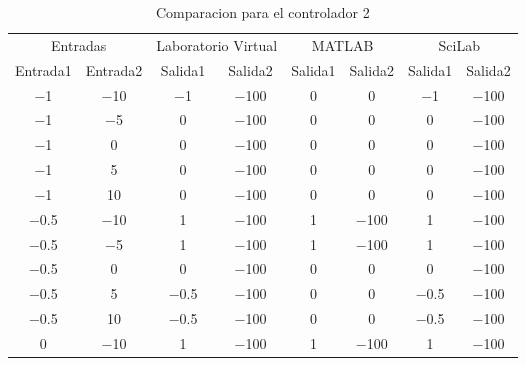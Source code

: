         {\setlength\LTleft{0pt}
        \setlength\LTright{0pt}
        \centering
        \scriptsize
        \renewcommand{\arraystretch}{0.89}
        \begin{longtable}{c @{\extracolsep{\fill}} ccccccc}
        \caption[Comparacion de diseño de controladores difusos - controlador 2]{Comparacion para el controlador 2} 
        \label{tab:C2Difuso} \\
        \toprule
        \multicolumn{2}{c}{Entradas}& \multicolumn{2}{c}{Laboratorio Virtual} & \multicolumn{2}{c}{MATLAB} & \multicolumn{2}{c}{SciLab} \\ \cmidrule{1-2}\cmidrule{3-4}\cmidrule{5-6}\cmidrule{7-8}
        Entrada1   & Entrada2  & Salida1    & Salida2    & Salida1   & Salida2    & Salida1    & Salida2     \\ \cmidrule{1-1}\cmidrule{2-2} \cmidrule{3-3}\cmidrule{4-4}\cmidrule{5-5}\cmidrule{6-6}\cmidrule{7-7}\cmidrule{8-8} 
        \endhead
        \bottomrule
        \endfoot
        \num{-1}   & \num{-10} & \num{-1}   & \num{-100} & \num{0}   & \num{0}    & \num{-1}   & \num{-100}  \\
        \num{-1}   & \num{-5}  & \num{0}    & \num{-100} & \num{0}   & \num{0}    & \num{0}    & \num{-100}  \\
        \num{-1}   & \num{0}   & \num{0}    & \num{-100} & \num{0}   & \num{0}    & \num{0}    & \num{-100}  \\
        \num{-1}   & \num{5}   & \num{0}    & \num{-100} & \num{0}   & \num{0}    & \num{0}    & \num{-100}  \\
        \num{-1}   & \num{10}  & \num{0}    & \num{-100} & \num{0}   & \num{0}    & \num{0}    & \num{-100}  \\
        \num{-0.5} & \num{-10} & \num{1}    & \num{-100} & \num{1}   & \num{-100} & \num{1}    & \num{-100}  \\
        \num{-0.5} & \num{-5}  & \num{1}    & \num{-100} & \num{1}   & \num{-100} & \num{1}    & \num{-100}  \\
        \num{-0.5} & \num{0}   & \num{0}    & \num{-100} & \num{0}   & \num{0}    & \num{0}    & \num{-100}  \\
        \num{-0.5} & \num{5}   & \num{-0.5} & \num{-100} & \num{0}   & \num{0}    & \num{-0.5} & \num{-100}  \\
        \num{-0.5} & \num{10}  & \num{-0.5} & \num{-100} & \num{0}   & \num{0}    & \num{-0.5} & \num{-100}  \\
        \num{0}    & \num{-10} & \num{1}    & \num{-100} & \num{1}   & \num{-100} & \num{1}    & \num{-100}  \\

\end{longtable}}
